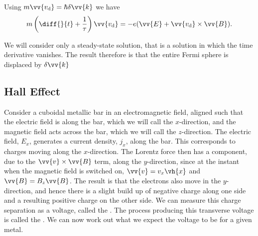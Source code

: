 \documentclass[fleqn]{NotesClass}
\begin{document}
    Using \(m\vv{v_{\mathrm{d}}} = \hbar\delta\vv{k}\) we have
    \begin{equation}
        m\left( \diff{}{t} + \frac{1}{\tau} \right)\vv{v_{\mathrm{d}}} = -e(\vv{E} + \vv{v_{\mathrm{d}}} \times \vv{B}).
    \end{equation}
    
    We will consider only a steady-state solution, that is a solution in which the time derivative vanishes.
    The result therefore is that the entire Fermi sphere is displaced by \(\delta\vv{k}\)
    
    \subsection{Hall Effect}
    Consider a cuboidal metallic bar in an electromagnetic field, aligned such that the electric field is along the bar, which we will call the \(x\)-direction, and the magnetic field acts across the bar, which we will call the \(z\)-direction.
    The electric field, \(E_x\), generates a current density, \(j_x\), along the bar.
    This corresponds to charges moving along the \(x\)-direction.
    The Lorentz force then has a component, due to the \(\vv{v} \times \vv{B}\) term, along the \(y\)-direction, since at the instant when the magnetic field is switched on, \(\vv{v} = v_x\vh{x}\) and \(\vv{B} = B_z\vv{B}\).
    The result is that the electrons also move in the \(y\)-direction, and hence there is a slight build up of negative charge along one side and a resulting positive charge on the other side.
    We can measure this charge separation as a voltage, called the .
    The process producing this transverse voltage is called the .
    We can now work out what we expect the voltage to be for a given metal.
    
\end{document}
